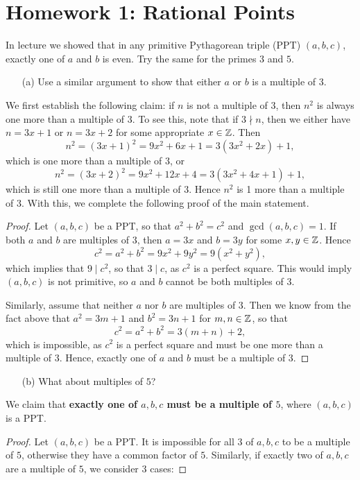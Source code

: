\documentclass{article}
\begin{document}
\section*{Homework 1: Rational Points}
\begin{exercise}[Chapter 2 \#1]
In lecture we showed that in any primitive Pythagorean triple (PPT) $(a, b, c)$, exactly one of $a$ and $b$ is
even. Try the same for the primes $3$ and $5$.

\begin{itemize}
    \item[(a)] Use a similar argument to show that either $a$ or $b$ is a multiple of $3$.
\end{itemize}
We first establish the following claim: if $n$ is not a multiple of $3$, then $n^2$ is always one more than a multiple of $3$. To see this, note that if $3\nmid n$, then we either have $n = 3x+1$ or $n = 3x+2$ for some appropriate $x\in\mathbb Z$. Then
$$n^2=(3x+1)^2= 9x^2+6x+1 = 3(3x^2+2x)+1,$$
which is one more than a multiple of $3$, or
$$n^2=(3x+2)^2 = 9x^2+12x+4 = 3(3x^2+4x+1)+1,$$
which is still one more than a multiple of $3$. Hence $n^2$ is 1 more than a multiple of $3$. With this, we complete the following proof of the main statement.

\begin{proof}
Let $(a,b,c)$ be a PPT, so that $a^2 + b^2 = c^2$ and $\gcd(a,b,c)=1$. If both $a$ and $b$ are multiples of $3$, then $a=3x$ and $b=3y$ for some $x,y\in\mathbb Z$. Hence
$$c^2 = a^2+b^2 = 9x^2 + 9y^2 = 9(x^2+y^2),$$
which implies that $9\mid c^2$, so that $3\mid c$, as $c^2$ is a perfect square. This would imply $(a,b,c)$ is not primitive, so $a$ and $b$ cannot be both multiples of $3$.

Similarly, assume that neither $a$ nor $b$ are multiples of $3$. Then we know from the fact above that $a^2 = 3m+1$ and $b^2 = 3n+1$ for $m,n \in \mathbb Z$, so that
$$c^2 = a^2+b^2 = 3(m+n)+2,$$
which is impossible, as $c^2$ is a perfect square and must be one more than a multiple of $3$. Hence, exactly one of $a$ and $b$ must be a multiple of $3$.
\end{proof}
\begin{itemize}
    \item[(b)] What about multiples of $5$?
\end{itemize}
We claim that \textbf{exactly one of $a,b,c$ must be a multiple of $5$}, where $(a,b,c)$ is a PPT.
\begin{proof}
Let $(a,b,c)$ be a PPT. It is impossible for all $3$ of $a,b,c$ to be a multiple of $5$, otherwise they have a common factor of $5$. Similarly, if exactly two of $a,b,c$ are a multiple of $5$, we consider $3$ cases:


\end{proof}
\end{exercise}
\end{document}
